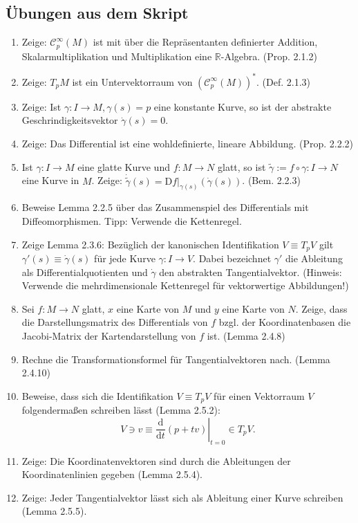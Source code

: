 \documentclass[a4paper,headsepline,headheight=30pt,numbers=enddot]{scrartcl}
\newcommand{\D}{\mathrm{d}}
\newcommand{\DD}{\mathrm{D}}
\newcommand{\sC}{\mathcal{C}^{\infty}}
\begin{document}
	\subsection*{Übungen aus dem Skript}
	\begin{enumerate}
		\item Zeige: $\sC_p(M)$ ist mit über die Repräsentanten definierter Addition, Skalarmultiplikation und Multiplikation eine $\mathbb R$-Algebra. (Prop. 2.1.2)
		\item Zeige: $T_pM$ ist ein Untervektorraum von $(\sC_p(M))^*$. (Def. 2.1.3)
		\item Zeige: Ist $\gamma\colon I\to M, \gamma(s) = p$ eine konstante Kurve, so ist der abstrakte Geschrindigkeitsvektor $\dot\gamma(s) = 0$.
		\item Zeige: Das Differential ist eine wohldefinierte, lineare Abbildung. (Prop. 2.2.2)
		\item Ist $\gamma\colon I \to M$ eine glatte Kurve und $f\colon M \to N$ glatt, so ist $\tilde\gamma := f\circ\gamma \colon I \to N$ eine Kurve in $M$. Zeige: $\dot{\tilde\gamma}(s) = \left.\DD f\right|_{\gamma(s)} (\dot\gamma(s))$. (Bem. 2.2.3)
		\item Beweise Lemma 2.2.5 über das Zusammenspiel des Differentials mit Diffeomorphismen. Tipp: Verwende die Kettenregel.
		\item Zeige Lemma 2.3.6: Bezüglich der kanonischen Identifikation $V\equiv T_pV$ gilt $\gamma'(s) \equiv \dot\gamma(s)$ für jede Kurve $\gamma\colon I\rightarrow V$. Dabei bezeichnet $\gamma'$ die Ableitung als Differentialquotienten und $\dot{\gamma}$ den abstrakten Tangentialvektor. (Hinweis: Verwende die mehrdimensionale Kettenregel für vektorwertige Abbildungen!)
		\item Sei $f\colon M \to N$ glatt, $x$ eine Karte von $M$ und $y$ eine Karte von $N$. Zeige, dass die Darstellungsmatrix des Differentials von $f$ bzgl. der Koordinatenbasen die Jacobi-Matrix der Kartendarstellung von $f$ ist. (Lemma 2.4.8)
		\item Rechne die Transformationsformel für Tangentialvektoren nach. (Lemma 2.4.10)
		\item Beweise, dass sich die Identifikation $V\equiv T_pV$ für einen Vektorraum $V$ folgendermaßen schreiben lässt (Lemma 2.5.2): 
		\[V \ni v \equiv \left.\frac{\D}{\D t}(p + tv)\right|_{t=0} \in T_pV.\]
		\item Zeige: Die Koordinatenvektoren sind durch die Ableitungen der Koordinatenlinien gegeben (Lemma 2.5.4).
		\item Zeige: Jeder Tangentialvektor lässt sich als Ableitung einer Kurve schreiben (Lemma 2.5.5).
	\end{enumerate}
\end{document}
